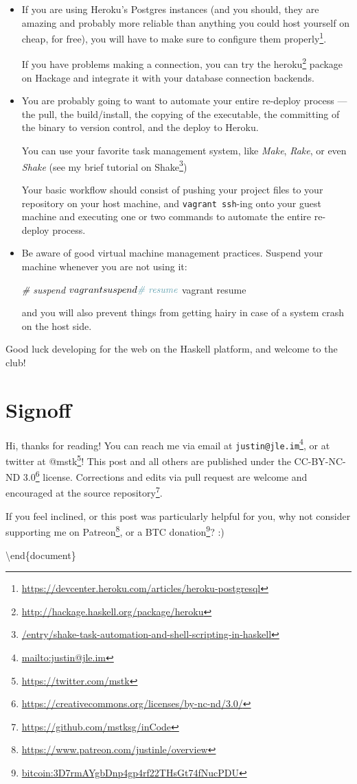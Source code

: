 \documentclass[]{article}
\newenvironment{Shaded}{}{}
\newcommand{\CommentTok}[1]{\textcolor[rgb]{0.38,0.63,0.69}{\textit{#1}}}
\newcommand{\ExtensionTok}[1]{#1}
\newcommand{\NormalTok}[1]{#1}
\renewcommand{\href}[2]{#2\footnote{\url{#1}}}
\begin{document}
\begin{itemize}
\item
  If you are using Heroku's Postgres instances (and you should, they are amazing
  and probably more reliable than anything you could host yourself on cheap, for
  free), you will have to make sure to
  \href{https://devcenter.heroku.com/articles/heroku-postgresql}{configure them
  properly}.

  If you have problems making a connection, you can try the
  \href{http://hackage.haskell.org/package/heroku}{heroku} package on Hackage
  and integrate it with your database connection backends.
\item
  You are probably going to want to automate your entire re-deploy process ---
  the pull, the build/install, the copying of the executable, the committing of
  the binary to version control, and the deploy to Heroku.

  You can use your favorite task management system, like \emph{Make},
  \emph{Rake}, or even \emph{Shake} (see my
  \href{/entry/shake-task-automation-and-shell-scripting-in-haskell}{brief
  tutorial on Shake})

  Your basic workflow should consist of pushing your project files to your
  repository on your host machine, and \texttt{vagrant\ ssh}-ing onto your guest
  machine and executing one or two commands to automate the entire re-deploy
  process.
\item
  Be aware of good virtual machine management practices. Suspend your machine
  whenever you are not using it:

\begin{Shaded}
\begin{Highlighting}[]
\CommentTok{\#   suspend}
\ExtensionTok{$}\NormalTok{ vagrant suspend}
\CommentTok{\#   resume}
\ExtensionTok{$}\NormalTok{ vagrant resume}
\end{Highlighting}
\end{Shaded}

  and you will also prevent things from getting hairy in case of a system crash
  on the host side.
\end{itemize}

Good luck developing for the web on the Haskell platform, and welcome to the
club!

\section{Signoff}\label{signoff}

Hi, thanks for reading! You can reach me via email at
\href{mailto:justin@jle.im}{\nolinkurl{justin@jle.im}}, or at twitter at
\href{https://twitter.com/mstk}{@mstk}! This post and all others are published
under the \href{https://creativecommons.org/licenses/by-nc-nd/3.0/}{CC-BY-NC-ND
3.0} license. Corrections and edits via pull request are welcome and encouraged
at \href{https://github.com/mstksg/inCode}{the source repository}.

If you feel inclined, or this post was particularly helpful for you, why not
consider \href{https://www.patreon.com/justinle/overview}{supporting me on
Patreon}, or a \href{bitcoin:3D7rmAYgbDnp4gp4rf22THsGt74fNucPDU}{BTC donation}?
:)

\textbackslash end\{document\}
\end{document}
